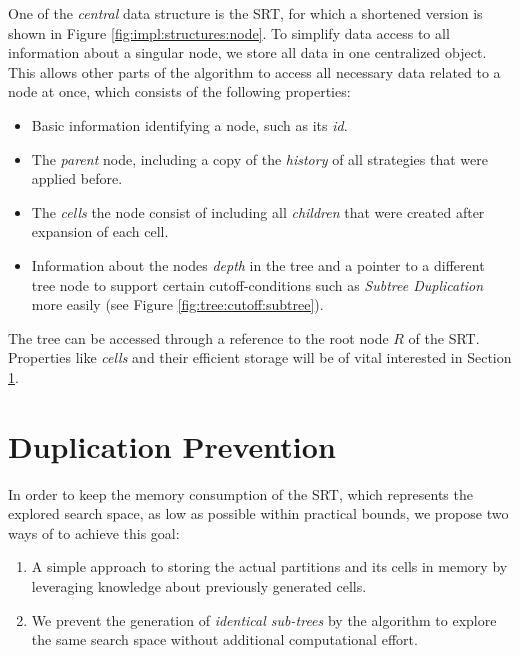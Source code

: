 			One of the \textit{central} data structure is the \ac{SRT}, for which a shortened version is shown in Figure \ref{fig:impl:structures:node}.
			To simplify data access to all information about a singular node, we store all data in one centralized object. This allows other parts of the algorithm to access all necessary data related to a node at once, which consists of the following properties:

			\begin{itemize}
				\item Basic information identifying a node, such as its \textit{id}.
				\item The \textit{parent} node, including a copy of the \textit{history} of all strategies that were applied before.
				\item The \textit{cells} the node consist of including all \textit{children} that were created after expansion of each cell.
				\item Information about the nodes \textit{depth} in the tree and a pointer to a different tree node to support certain cutoff-conditions such as \textit{Subtree Duplication} more easily (see Figure \ref{fig:tree:cutoff:subtree}).
			\end{itemize}

			The tree can be accessed through a reference to the root node $R$ of the \ac{SRT}.
			Properties like \textit{cells} and their efficient storage will be of vital interested in Section \ref{chap:impl:hashing}.

		\clearpage

	\section{Duplication Prevention}
	\label{chap:impl:hashing}

		In order to keep the memory consumption of the \ac{SRT}, which represents the explored search space, as low as possible within practical bounds, we propose two ways of to achieve this goal:

		\begin{enumerate}
			\item A simple approach to storing the actual partitions and its cells in memory by leveraging knowledge about previously generated cells.
			\item We prevent the generation of \textit{identical sub-trees} by the algorithm to explore the same search space without additional computational effort.
		\end{enumerate}

